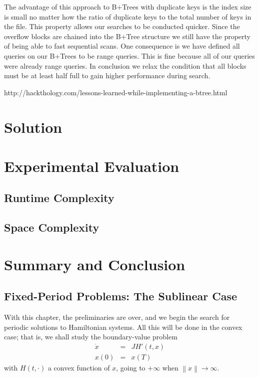 \documentclass[abstracton,12pt]{scrreprt}
\begin{document}
The advantage of this approach to B+Trees with duplicate keys is the index size is small no matter how the ratio of duplicate keys to the total number of keys in the file. This property allows our searches to be conducted quicker. Since the overflow blocks are chained into the B+Tree structure we still have the property of being able to fast sequential scans. One consequence is we have defined all queries on our B+Trees to be range queries. This is fine because all of our queries were already range queries. In conclusion we relax the condition that all blocks must be at least half full to gain higher performance during search.

http://hackthology.com/lessons-learned-while-implementing-a-btree.html

\chapter{Solution}




\chapter{Experimental Evaluation}

\section{Runtime Complexity}
\section{Space Complexity}

\chapter{Summary and Conclusion}

\section{Fixed-Period Problems: The Sublinear Case}

With this chapter, the preliminaries are over, and we begin the search
for periodic solutions to Hamiltonian systems. All this will be done
in the convex case; that is, we shall study the boundary-value problem
\begin{eqnarray*}
  \dot{x}&=&JH' (t,x)\\
  x(0) &=& x(T)
\end{eqnarray*}
with $H(t,\cdot)$ a convex function of $x$, going to $+\infty$ when
$\left\|x\right\| \to \infty$.
\end{document}
